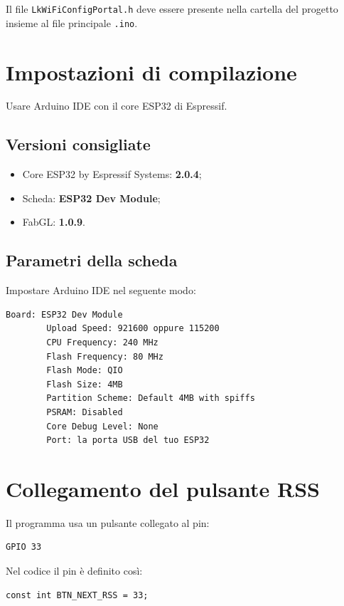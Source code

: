 \documentclass[11pt,a4paper]{article}
\begin{document}
	Il file \texttt{LkWiFiConfigPortal.h} deve essere presente nella cartella del progetto insieme al file principale \texttt{.ino}.
	
	\section{Impostazioni di compilazione}
	
	Usare Arduino IDE con il core ESP32 di Espressif.
	
	\subsection{Versioni consigliate}
	
	\begin{itemize}
		\item Core ESP32 by Espressif Systems: \textbf{2.0.4};
		\item Scheda: \textbf{ESP32 Dev Module};
		\item FabGL: \textbf{1.0.9}.
	\end{itemize}
	
	\subsection{Parametri della scheda}
	
	Impostare Arduino IDE nel seguente modo:
	
	\begin{lstlisting}[style=codice]
		Board: ESP32 Dev Module
		Upload Speed: 921600 oppure 115200
		CPU Frequency: 240 MHz
		Flash Frequency: 80 MHz
		Flash Mode: QIO
		Flash Size: 4MB
		Partition Scheme: Default 4MB with spiffs
		PSRAM: Disabled
		Core Debug Level: None
		Port: la porta USB del tuo ESP32
	\end{lstlisting}
	
	\section{Collegamento del pulsante RSS}
	
	Il programma usa un pulsante collegato al pin:
	
	\begin{lstlisting}[style=codice]
		GPIO 33
	\end{lstlisting}
	
	Nel codice il pin è definito così:
	
	\begin{lstlisting}[style=codice]
		const int BTN_NEXT_RSS = 33;
	\end{lstlisting}
	
\end{document}
